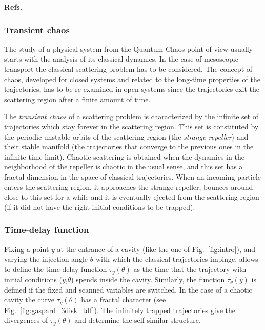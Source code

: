 \documentclass[a4paper,10pt]{article}
\newcommand{\nin}{\noindent}
\begin{document}
{\bf Refs.~\cite{LesHouSm,tel,Gaspard}}

\subsubsection{Transient chaos}

The study of a physical system from the Quantum Chaos point of
view usually starts with the analysis of its classical dynamics. In the case of mesoscopic transport the classical scattering problem has to be considered. The concept of chaos, developed for closed systems and related to the long-time properties of the trajectories, has to be re-examined in open systems since the trajectories exit the scattering region after a finite amount of
time. 

\nin The {\it transient chaos} of a scattering problem is characterized
by the infinite set of trajectories which stay forever in the scattering
region. This set is constituted by the periodic unstable
orbits of the scattering region (the {\it strange repeller}) and
their stable manifold (the trajectories that converge to the
previous ones in the infinite-time limit). Chaotic scattering
is obtained when the dynamics in the neighborhood of the repeller
is chaotic in the usual sense, and this set has a fractal 
dimension in the space of classical trajectories. When an 
incoming particle enters the scattering region, it approaches
the strange repeller, bounces around close to this set for a 
while and it is eventually ejected from the scattering region 
(if it did not have the right initial conditions to be trapped). 

\subsubsection{Time-delay function}

Fixing a point $y$ at the entrance of a cavity (like the one of 
Fig.~\ref{fig:intro}), and varying the injection angle $\theta$ with which the classical trajectories impinge, allows to define the 
time-delay function $\tau_y(\theta)$ as the time that the trajectory with initial conditions ($y$,$\theta$) spends inside the cavity. Similarly, the function $\tau_{\theta}(y)$ is defined if the fixed and scanned variables are switched. In the case of a chaotic cavity the curve $\tau_y(\theta)$  has a fractal character (see Fig.~\ref{fig:gaspard_3disk_tdf}). The infinitely trapped trajectories give the divergences of $\tau_y(\theta)$ and determine the self-similar structure. 
\end{document}
